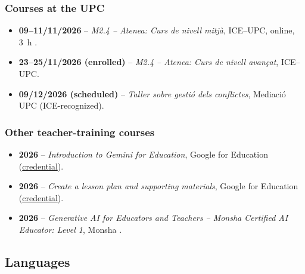 \documentclass[11pt]{article}
\begin{document}
\subsubsection*{Courses at the UPC}
\begin{itemize}[itemsep=1pt]
  \item \textbf{09--11/11/2026} -- \emph{M2.4 -- Atenea: Curs de nivell mitj\`a}, ICE--UPC, online, 3~h .
  \item \textbf{23--25/11/2026 (enrolled)} -- \emph{M2.4 -- Atenea: Curs de nivell avan\c{c}at}, ICE--UPC.
  \item \textbf{09/12/2026 (scheduled)} -- \emph{Taller sobre gesti\'o dels conflictes}, Mediaci\'o UPC (ICE-recognized).
\end{itemize}

\subsubsection*{Other teacher-training courses}
\begin{itemize}[itemsep=1pt]
  \item \textbf{2026} -- \emph{Introduction to Gemini for Education}, Google for Education
  (\href{https://edu.google.accredible.com/9e5d562b-d731-4909-a64e-02fec77496c1}{credential}).
  \item \textbf{2026} -- \emph{Create a lesson plan and supporting materials}, Google for Education
  (\href{https://edu.google.accredible.com/40c5d590-11e2-4418-a7be-5a64a7268e6c}{credential}).
  \item \textbf{2026} -- \emph{Generative AI for Educators and Teachers -- Monsha Certified AI
  Educator: Level 1}, Monsha .
\end{itemize}

\subsection{Languages}\label{sec:languages}
\begin{entries}
\end{entries}
\end{document}
